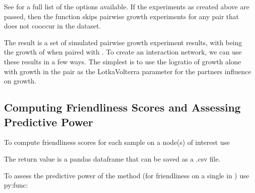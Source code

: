 \documentclass[letterpaper,10pt,english]{sphinxmanual}
\begin{document}
\sphinxAtStartPar
See {\hyperref[\detokenize{network_build:make_gem_network.get_pairwise_growth}]{}} for a full list of the options available. If the experiments as created above
are passed, then the function skips pairwise growth experiments for any pair that does not co\sphinxhyphen{}occur in the dataset.

\sphinxAtStartPar
The result is a set of simulated pairwise growth experiment results, with  being the growth of  when paired with . To create an interaction network, we can use these results in a few ways.
The simplest is to use the log\sphinxhyphen{}ratio of growth alone with growth in the pair as the Lotka\sphinxhyphen{}Volterra parameter for the partners influence on growth.


\subsection{Computing Friendliness Scores and Assessing Predictive Power}
\label{\detokenize{usage:computing-friendliness-scores-and-assessing-predictive-power}}
\sphinxAtStartPar
To compute friendliness scores for each sample on a node(s) of interest use {\hyperref[\detokenize{scoring:score_net.network_friendliness}]{}}

\begin{sphinxVerbatim}[commandchars=\\\{\}]
   

  
   
    \PYG{p}{[}\PYG{p}{]}  
\end{sphinxVerbatim}

\sphinxAtStartPar
The return value is a pandas dataframe that can be saved as a .csv file.

\sphinxAtStartPar
To assess the predictive power of the method (for friendliness on a single  in ) use py:func:
\end{document}

